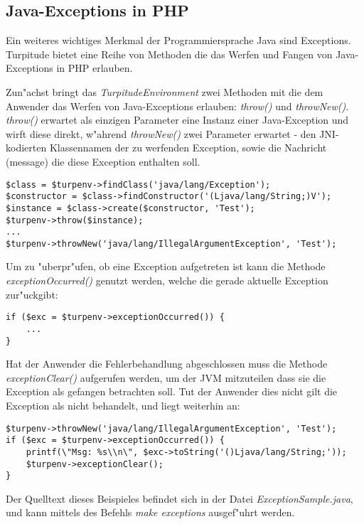 \subsection{Java-Exceptions in PHP}
\label{sec:app1:exceptions}

Ein weiteres wichtiges Merkmal der Programmiersprache Java sind Exceptions. 
Turpitude bietet eine Reihe von Methoden die das Werfen und Fangen von Java-Exceptions
in PHP erlauben.

Zun"achst bringt das \emph{TurpitudeEnvironment} zwei Methoden mit die dem Anwender
das Werfen von Java-Exceptions erlauben: \emph{throw()} und \emph{throwNew()}. \emph{throw()}
erwartet als einzigen Parameter eine Instanz einer Java-Exception und wirft diese direkt,
w"ahrend \emph{throwNew()} zwei Parameter erwartet - den JNI-kodierten Klassennamen der
zu werfenden Exception, sowie die Nachricht (message) die diese Exception enthalten soll.
\begin{lstlisting}[caption=Werfen von Exceptions]
$class = $turpenv->findClass('java/lang/Exception');
$constructor = $class->findConstructor('(Ljava/lang/String;)V');
$instance = $class->create($constructor, 'Test');
$turpenv->throw($instance);
...
$turpenv->throwNew('java/lang/IllegalArgumentException', 'Test');
\end{lstlisting}
Um zu "uberpr"ufen, ob eine Exception aufgetreten ist kann die Methode \emph{exceptionOccurred()}
genutzt werden, welche die gerade aktuelle Exception zur"uckgibt:
\begin{lstlisting}[caption=Exceptions aufgetreten?]
if ($exc = $turpenv->exceptionOccurred()) {
    ...
}
\end{lstlisting}
Hat der Anwender die Fehlerbehandlung abgeschlossen muss die Methode \emph{exceptionClear()} aufgerufen
werden, um der JVM mitzuteilen dass sie die Exception als gefangen betrachten soll. Tut der Anwender
dies nicht gilt die Exception als nicht behandelt, und liegt weiterhin an:
\begin{lstlisting}[caption=Exceptions behandeln]
$turpenv->throwNew('java/lang/IllegalArgumentException', 'Test');
if ($exc = $turpenv->exceptionOccurred()) {
    printf(\"Msg: %s\\n\", $exc->toString('()Ljava/lang/String;'));
    $turpenv->exceptionClear();
}
\end{lstlisting}

Der Quelltext dieses Beispieles befindet sich in der Datei \emph{ExceptionSample.java}, 
und kann mittels des Befehls \emph{make exceptions} ausgef"uhrt werden.

